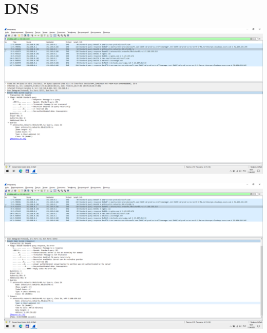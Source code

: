 
\section{DNS}

\includegraphics[width=\textwidth]{screenshots/dns_request_1}

\includegraphics[width=\textwidth]{screenshots/dns_response_1}
